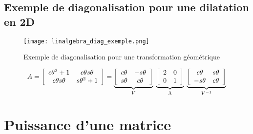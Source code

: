 \subsection{Exemple de diagonalisation pour une dilatation en 2D}
\label{sec:ExempleDeDiagonalisationPourUneDillatationEn2D}

\begin{figure}[H]
	\centering
	\texttt{[image: linalgebra\_diag\_exemple.png]}
	\caption{Exemple de diagonalisation pour une transformation géométrique}
	\label{fig:linalgebra_diag_exemple}
\end{figure}

\begin{align}
	A =
	\left[ \begin{array}{c c}
			   c\theta^2+1     & c\theta s\theta \\
			   c\theta s\theta & s\theta^2+1
	\end{array} \right]
	=
	\underbrace{
		\left[ \begin{array}{c c}
				   c\theta & - s\theta \\
				   s\theta &   c\theta
		\end{array} \right]
	}_{V}
	\;
	\underbrace{
		\left[ \begin{array}{c c}
				   2 & 0 \\
				   0 & 1
		\end{array} \right]
	}_{\Lambda}
	\;
	\underbrace{
		\left[ \begin{array}{c c}
				   c\theta &   s\theta \\
				   - s\theta &   c\theta
		\end{array} \right]
	}_{V^{-1}}
\end{align}









\section{Puissance d'une matrice}

